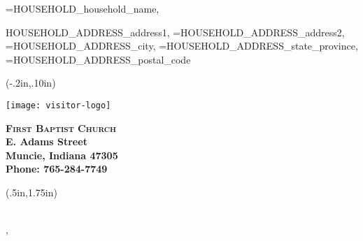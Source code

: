 \documentclass[10pt,letterpaper]{article}
\begin{document}
{\name=HOUSEHOLD_household_name, \address=HOUSEHOLD_ADDRESS_address1, \addresstwo=HOUSEHOLD_ADDRESS_address2, \city=HOUSEHOLD_ADDRESS_city, \state=HOUSEHOLD_ADDRESS_state_province, \zip=HOUSEHOLD_ADDRESS_postal_code}{
  
\thispagestyle{empty}

\begin{textblock*}{3in}(-.2in,.10in)
  \begin{minipage}{.5in}
   \texttt{[image: visitor-logo]}
  \end{minipage}
  \begin{minipage}{1.5in}
  \noindent \bfseries \textsc{First Baptist Church} \\
   E. Adams Street \\
  Muncie, Indiana 47305 \\
  Phone: 765-284-7749
  \end{minipage}
\end{textblock*}


{
 \begin{textblock*}{3in}(.5in,1.75in)
 \noindent \bfseries \textsc{\name} \\
 \normalfont \address \addresstwo \\
 \city, \state \zip \\
 \end{textblock*}
}

\pagebreak





}
\end{document}
